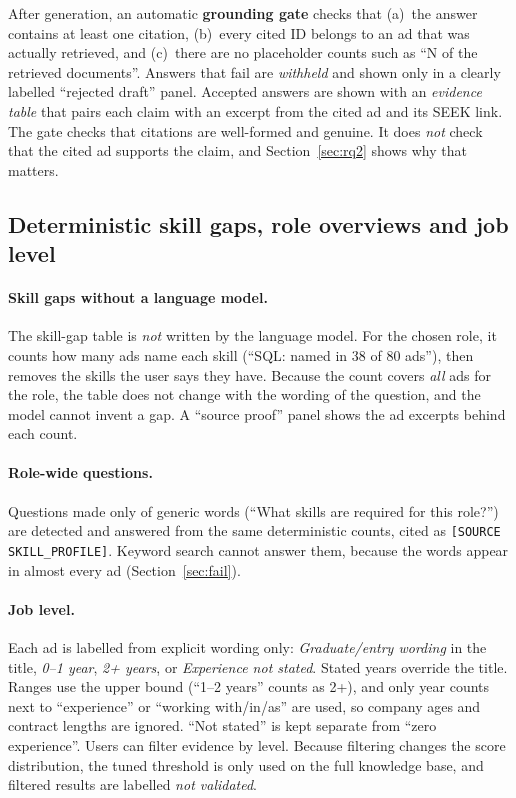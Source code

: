 After generation, an automatic \textbf{grounding gate} checks that (a)~the answer contains at least one citation, (b)~every cited ID belongs to an ad that was actually retrieved, and (c)~there are no placeholder counts such as ``N of the retrieved documents''. Answers that fail are \emph{withheld} and shown only in a clearly labelled ``rejected draft'' panel. Accepted answers are shown with an \emph{evidence table} that pairs each claim with an excerpt from the cited ad and its SEEK link. The gate checks that citations are well-formed and genuine. It does \emph{not} check that the cited ad supports the claim, and Section~\ref{sec:rq2} shows why that matters.

\subsection{Deterministic skill gaps, role overviews and job level}\label{sec:overview}

\paragraph{Skill gaps without a language model.} The skill-gap table is \emph{not} written by the language model. For the chosen role, it counts how many ads name each skill (``SQL: named in 38 of 80 ads''), then removes the skills the user says they have. Because the count covers \emph{all} ads for the role, the table does not change with the wording of the question, and the model cannot invent a gap. A ``source proof'' panel shows the ad excerpts behind each count.

\paragraph{Role-wide questions.} Questions made only of generic words (``What skills are required for this role?'') are detected and answered from the same deterministic counts, cited as \texttt{[SOURCE SKILL\_PROFILE]}. Keyword search cannot answer them, because the words appear in almost every ad (Section~\ref{sec:fail}).

\paragraph{Job level.} Each ad is labelled from explicit wording only: \emph{Graduate/entry wording} in the title, \emph{0--1 year}, \emph{2+ years}, or \emph{Experience not stated}. Stated years override the title. Ranges use the upper bound (``1--2 years'' counts as 2+), and only year counts next to ``experience'' or ``working with/in/as'' are used, so company ages and contract lengths are ignored. ``Not stated'' is kept separate from ``zero experience''. Users can filter evidence by level. Because filtering changes the score distribution, the tuned threshold is only used on the full knowledge base, and filtered results are labelled \emph{not validated}.

